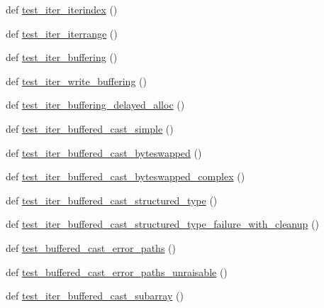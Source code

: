 \begin{DoxyCompactItemize}
\item 
def \hyperlink{namespacenumpy_1_1core_1_1tests_1_1test__nditer_abc54f07ba537d90e4dcb37fb7b01fca8}{test\+\_\+iter\+\_\+iterindex} ()
\item 
def \hyperlink{namespacenumpy_1_1core_1_1tests_1_1test__nditer_a09f38f27fc5cf6bb944213e46ec08ac9}{test\+\_\+iter\+\_\+iterrange} ()
\item 
def \hyperlink{namespacenumpy_1_1core_1_1tests_1_1test__nditer_a6c3bd553a0697537ddd5aba795f7733f}{test\+\_\+iter\+\_\+buffering} ()
\item 
def \hyperlink{namespacenumpy_1_1core_1_1tests_1_1test__nditer_ac2521e76e4fd58b9d73736cc2a59af46}{test\+\_\+iter\+\_\+write\+\_\+buffering} ()
\item 
def \hyperlink{namespacenumpy_1_1core_1_1tests_1_1test__nditer_a4e8b8d907542f3b22e6f70f51e06a9ac}{test\+\_\+iter\+\_\+buffering\+\_\+delayed\+\_\+alloc} ()
\item 
def \hyperlink{namespacenumpy_1_1core_1_1tests_1_1test__nditer_a70bbd54f5c80026598b9a24fc552a1a0}{test\+\_\+iter\+\_\+buffered\+\_\+cast\+\_\+simple} ()
\item 
def \hyperlink{namespacenumpy_1_1core_1_1tests_1_1test__nditer_a1f4a1322212e42e82b4c899424bd9fd7}{test\+\_\+iter\+\_\+buffered\+\_\+cast\+\_\+byteswapped} ()
\item 
def \hyperlink{namespacenumpy_1_1core_1_1tests_1_1test__nditer_afc7cc8b22b7c19415b6a7fa7390b1597}{test\+\_\+iter\+\_\+buffered\+\_\+cast\+\_\+byteswapped\+\_\+complex} ()
\item 
def \hyperlink{namespacenumpy_1_1core_1_1tests_1_1test__nditer_a98ee978e4b928efb01a167698a4410d0}{test\+\_\+iter\+\_\+buffered\+\_\+cast\+\_\+structured\+\_\+type} ()
\item 
def \hyperlink{namespacenumpy_1_1core_1_1tests_1_1test__nditer_a6375610f456b11b79e364202c906743a}{test\+\_\+iter\+\_\+buffered\+\_\+cast\+\_\+structured\+\_\+type\+\_\+failure\+\_\+with\+\_\+cleanup} ()
\item 
def \hyperlink{namespacenumpy_1_1core_1_1tests_1_1test__nditer_a0dc477a2052c8fd0d73482f7f4b4c96e}{test\+\_\+buffered\+\_\+cast\+\_\+error\+\_\+paths} ()
\item 
def \hyperlink{namespacenumpy_1_1core_1_1tests_1_1test__nditer_aa997e1b7c0ffdd044e4e58891aa56ce2}{test\+\_\+buffered\+\_\+cast\+\_\+error\+\_\+paths\+\_\+unraisable} ()
\item 
def \hyperlink{namespacenumpy_1_1core_1_1tests_1_1test__nditer_aa1598c9b3bd45284507486546be07bd4}{test\+\_\+iter\+\_\+buffered\+\_\+cast\+\_\+subarray} ()

\end{DoxyCompactItemize}
